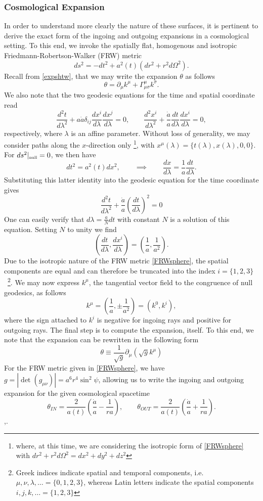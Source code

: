 \subsubsection*{Cosmological Expansion}
In order to understand more clearly the nature of these surfaces, it is pertinent to derive the exact form of the ingoing and outgoing expansions in a cosmological setting. To this end, we invoke the  spatially flat, homogenous and isotropic Friedmann-Robertson-Walker (FRW) metric
\[
\label{FRWsphere}
ds^{2}=-dt^{2}+a^{2}(t)\left(dr^{2}+r^{2}d\Omega^{2}\right)
 . \]
Recall from \eqref{expshtw}, that we may write the expansion $\theta$ as follows
\[
\theta=\partial_{\mu}k^{\mu}+\Gamma_{\mu\sigma}^{\mu}k^{\sigma}.
\]
We also note that the two geodesic equations for the time and spatial coordinate read
\[
\frac{d^{2}t}{d\lambda^{2}}+a\dot{a}\delta_{ij}\frac{dx^{i}}{d\lambda}\frac{dx^{j}}{d\lambda}=0,\qquad
\frac{d^{2}x^{i}}{d\lambda^{2}}+\frac{\dot{a}}{a}\frac{dt}{d\lambda}\frac{dx^{i}}{d\lambda}=0
, \]
respectively, where $\lambda$ is an affine parameter.
Without loss of generality, we may consider paths along the $x$-direction only \footnote{where, at this time, we are considering the isotropic form of \eqref{FRWsphere} with $dr^{2}+r^{2}d\Omega^{2}=dx^2+dy^2+dz^2$}, with $x^{\mu}(\lambda)=\{t(\lambda),x(\lambda),0,0\}$. For $ds^{2}\rvert_{\mbox{{\tiny null}}}=0$, we then have
\[
dt^{2}=a^{2}(t)dx^{2},\qquad \implies \qquad \frac{dx}{d\lambda}=\frac{1}{a}\frac{dt}{d\lambda}.
 \]
Substituting this latter identity into the geodesic equation for the time coordinate gives
\[
\frac{d^{2}t}{d\lambda^{2}}+\frac{\dot{a}}{a}\left(\frac{dt}{d\lambda}\right)^{2}=0
 \]
One can easily verify that $d\lambda=\frac{a}{N}dt$ with constant $N$ is a solution of this equation. Setting $N$ to unity we find
\[
\left(\frac{dt}{d\lambda},\frac{dx^{i}}{d\lambda}\right)=\left(\frac{1}{a},\frac{1}{a^{2}}\right)
. \]
Due to the isotropic nature of the FRW metric \eqref{FRWsphere}, the spatial components are equal and can therefore be truncated into  the index $i=\{1,2,3\}$~\footnote{Greek indices indicate spatial and temporal components, i.e. $\mu,\nu,\lambda,\ldots=\{0,1,2,3\}$, whereas Latin letters indicate the spatial components $i,j,k,\ldots=\{1,2,3\}$}. We may now express $k^{\mu}$, the tangential vector field to the congruence of null geodesics, as follows
\[
\label{nullgeo}
k^{\mu}=\left(\frac{1}{a},\pm\frac{1}{a^{2}}\right)=(k^{0},k^{i}),
 \]
where the sign attached to $k^i$ is negative for ingoing rays and positive for outgoing rays. The final step is to compute the expansion, itself. To this end, we note that the expansion can be rewritten in the following form
\[
\theta\equiv\frac{1}{\sqrt{g}}\partial_\mu(\sqrt{g} k^\mu )
\]
For the FRW metric given in \eqref{FRWsphere}, we have $g=|\det(g_{\mu\nu})|=a^6 r^4 \sin^2\psi$, allowing us to write the ingoing and outgoing expansion for the given cosmological spacetime
\[
\label{nullgeoinout}
\theta_{IN}=\frac{2}{a(t)}\left(\frac{\dot{a}}{a}-\frac{1}{ra}\right),\qquad\theta_{OUT}=\frac{2}{a(t)}\left(\frac{\dot{a}}{a}+\frac{1}{ra}\right)
. \]
\cite{Vilenkin:2014yva},\cite{Vachaspati:1998dy}.
